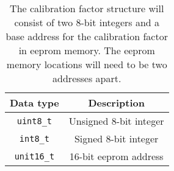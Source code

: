\begin{table}[ht]
  \begin{center}
    \begin{tabular}{|c|c|}
      \hline
      Data type &Description\\
      \hline\hline
      \texttt{uint8\_t} &Unsigned 8-bit integer\\
      \hline
      \texttt{int8\_t}   &Signed 8-bit integer\\
      \hline
      \texttt{unit16\_t} &16-bit eeprom address\\
      \hline
      \end{tabular}
      \caption{The calibration factor structure will consist of two
        8-bit integers and a base address for the calibration factor
        in eeprom memory.  The eeprom memory locations will need to be
        two addresses apart.}
  \end{center}
\end{table}

